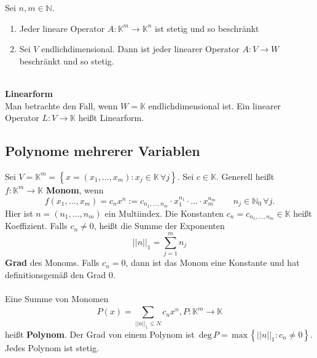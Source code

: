 \documentclass[a4paper,12pt]{article}
\begin{document}
Sei $n,m \in \mathbb{N}$. 
\begin{enumerate}[label=\arabic*.]
        \item Jeder lineare Operator $A:\mathbb{K}^m\rightarrow \mathbb{K}^n$ ist stetig und so beschränkt
        \item Sei $V$ endlichdimensional. Dann ist jeder linearer Operator $A:V\rightarrow W$ beschränkt und so stetig.
\end{enumerate}
\hfill\\\textbf{Linearform}\\ 
Man betrachte den Fall, wenn $W=\mathbb{K}$ endlichdimensional ist. Ein linearer Operator $L:V\rightarrow \mathbb{K}$ heißt Linearform.

\subsection{Polynome mehrerer Variablen}
Sei $V=\mathbb{K}^m=\left\{x=(x_1,\hdots ,x_m):x_j \in \mathbb{K}\,\forall j\right\}$. Sei $c \in \mathbb{K}$. Generell heißt $f:\mathbb{K}^m\rightarrow \mathbb{K}$ \textbf{Monom}, wenn
\[ 
        f(x_1,\hdots ,x_m)=c_nx^n:=c _{n_1,\hdots ,n_m}\cdot x_1^{n_1}\cdot \hdots \cdot x_m ^{n_m}\qquad n_j \in \mathbb{N}_0\,\forall j
.\] 
Hier ist $n=(n_1,\hdots ,n_m)$ ein Multiindex. Die Konstanten $c_n=c _{n_1,\hdots ,n_m} \in \mathbb{K}$ heißt Koeffizient. Falls $c_n\neq 0$, heißt die Summe der Exponenten
\[ 
        ||n||_1=\sum_{j=1}^{m}n_j
\] 
\textbf{Grad} des Monoms. Falls $c_n=0$, dann ist das Monom eine Konstante und hat definitionsgemäß den Grad 0.\\\\\indent
Eine Summe von Monomen
\[ 
        P(x)=\sum_{||n||_1\leq N}^{}c_nx^n,P:\mathbb{K}^m\rightarrow \mathbb{K}
\] 
heißt \textbf{Polynom}. Der Grad von einem Polynom ist $\,\text{deg}\,P=\,\text{max}\,\left\{||n||_1:c_n\neq 0\right\}$. Jedes Polynom ist stetig.
\end{document}
